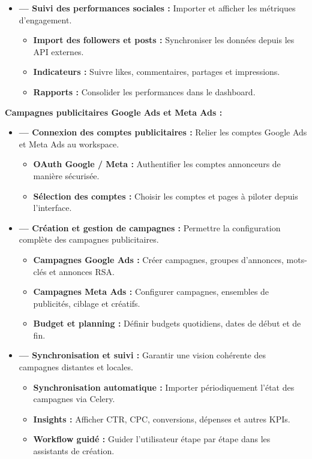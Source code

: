 \documentclass[12pt,a4paper]{report}
\numberwithin{figure}{chapter}
\numberwithin{table}{chapter}
\begin{document}
\begin{itemize}[leftmargin=2em,itemsep=6pt]
\item[] \textbf{--- Suivi des performances sociales :} Importer et afficher les métriques d’engagement.
\begin{itemize}[label=$\checkmark$,leftmargin=2em,itemsep=3pt]
\item \textbf{Import des followers et posts :} Synchroniser les données depuis les API externes.
\item \textbf{Indicateurs :} Suivre likes, commentaires, partages et impressions.
\item \textbf{Rapports :} Consolider les performances dans le dashboard.
\end{itemize}
\end{itemize}

\textbf{Campagnes publicitaires Google Ads et Meta Ads :}

\begin{itemize}[leftmargin=2em,itemsep=6pt]
\item[] \textbf{--- Connexion des comptes publicitaires :} Relier les comptes Google Ads et Meta Ads au workspace.
\begin{itemize}[label=$\checkmark$,leftmargin=2em,itemsep=3pt]
\item \textbf{OAuth Google / Meta :} Authentifier les comptes annonceurs de manière sécurisée.
\item \textbf{Sélection des comptes :} Choisir les comptes et pages à piloter depuis l’interface.
\end{itemize}

\item[] \textbf{--- Création et gestion de campagnes :} Permettre la configuration complète des campagnes publicitaires.
\begin{itemize}[label=$\checkmark$,leftmargin=2em,itemsep=3pt]
\item \textbf{Campagnes Google Ads :} Créer campagnes, groupes d’annonces, mots-clés et annonces RSA.
\item \textbf{Campagnes Meta Ads :} Configurer campagnes, ensembles de publicités, ciblage et créatifs.
\item \textbf{Budget et planning :} Définir budgets quotidiens, dates de début et de fin.
\end{itemize}

\item[] \textbf{--- Synchronisation et suivi :} Garantir une vision cohérente des campagnes distantes et locales.
\begin{itemize}[label=$\checkmark$,leftmargin=2em,itemsep=3pt]
\item \textbf{Synchronisation automatique :} Importer périodiquement l’état des campagnes via Celery.
\item \textbf{Insights :} Afficher CTR, CPC, conversions, dépenses et autres KPIs.
\item \textbf{Workflow guidé :} Guider l’utilisateur étape par étape dans les assistants de création.
\end{itemize}
\end{itemize}
\end{document}
